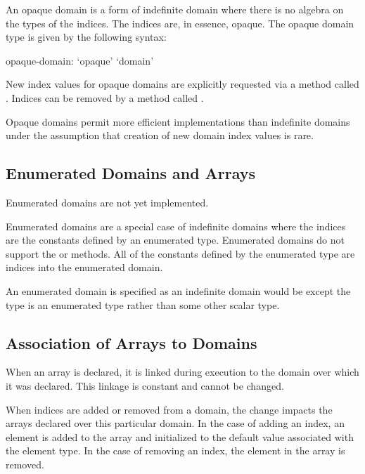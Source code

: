 An opaque domain is a form of indefinite domain where there is no
algebra on the types of the indices.  The indices are, in essence,
opaque.  The opaque domain type is given by the following syntax:
\begin{syntax}
opaque-domain:
  `opaque' `domain'
\end{syntax}

New index values for opaque domains are explicitly requested via a
method called .  Indices can be removed by a method
called .

Opaque domains permit more efficient implementations than indefinite
domains under the assumption that creation of new domain index values
is rare.

\subsection{Enumerated Domains and Arrays}
\label{Enumerated_Domains_and_Arrays}

\begin{implementation}
Enumerated domains are not yet implemented.
\end{implementation}

Enumerated domains are a special case of indefinite domains where the
indices are the constants defined by an enumerated type.  Enumerated
domains do not support the  or  methods.  All
of the constants defined by the enumerated type are indices into the
enumerated domain.

An enumerated domain is specified as an indefinite domain would be
except the type is an enumerated type rather than some other scalar
type.

\subsection{Association of Arrays to Domains}
\label{Association_of_Arrays_to_Domains}

When an array is declared, it is linked during execution to the domain
over which it was declared.  This linkage is constant and cannot be
changed.

When indices are added or removed from a domain, the change impacts
the arrays declared over this particular domain.  In the case of
adding an index, an element is added to the array and initialized to
the default value associated with the element type.  In the case of
removing an index, the element in the array is removed.

